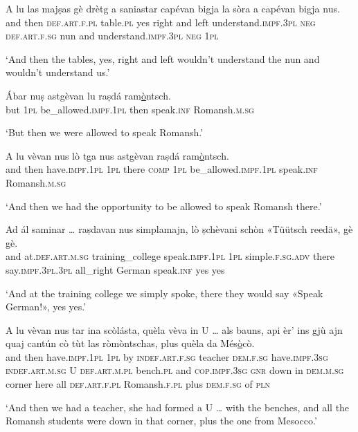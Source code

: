 \begin{linenumbers}
\gll    A lu las majṣas gè drètg a saniastar capévan bigja la sòra a capévan bigja nus.\\
and then \textsc{def.art.f.pl} table.\textsc{pl} yes right and left understand.\textsc{impf.3pl} \textsc{neg} \textsc{def.art.f.sg} nun and understand.\textsc{impf.3pl} \textsc{neg} \textsc{1pl}\\
\end{linenumbers}
\medskip
\glt `And then the tables, yes, right and left wouldn’t understand the nun and wouldn’t understand us.'
\medskip

\begin{linenumbers}
\gll    Ábar nuṣ astgèvan lu raṣdá ram\underline{ò}ntsch.\\
but \textsc{1pl}  be\_allowed.\textsc{impf.1pl} then speak.\textsc{inf} Romansh.\textsc{m.sg}\\
\end{linenumbers}
\medskip
\glt `But then we were allowed to speak Romansh.'
\medskip

\begin{linenumbers}
\gll    A lu vèvan nus lò tga nus astgèvan raṣdá ram\underline{ò}ntsch.\\
and then have.\textsc{impf.1pl} \textsc{1pl} there \textsc{comp} \textsc{1pl} be\_allowed.\textsc{impf.1pl} speak.\textsc{inf} Romansh.\textsc{m.sg} \\
\end{linenumbers}
\medskip
\glt `And then we had the opportunity to be allowed to speak Romansh there.'
\medskip

\begin{linenumbers}
\gll    Ad ál saminar … raṣdavan nus simplamajn, lò ṣchèvani schòn «Tüütsch reedä»\footnotemark, gè gè.\\
and at.\textsc{def.art.m.sg} training\_college {} speak.\textsc{impf.1pl} \textsc{1pl} simple.\textsc{f.sg.adv} there  say.\textsc{impf.3pl.3pl} all\_right German speak.\textsc{inf} yes yes \\
\end{linenumbers}
\medskip
\glt `And at the training college we simply spoke, there they would say «Speak German!», yes  yes.'
\medskip

\begin{linenumbers}
\gll    A lu vèvan nus tar ina scòlásta, quèla vèva in U … als bauns, api èr’ ins gjù ajn quaj cantún cò tùt las ròmòntschas, plus quèla da Més\underline{ò}cò.\footnotemark\\
and then have.\textsc{impf.1pl} \textsc{1pl} by \textsc{indef.art.f.sg} teacher \textsc{dem.f.sg}  have.\textsc{impf.3sg} \textsc{indef.art.m.sg} U {} \textsc{def.art.m.pl} bench.\textsc{pl} and \textsc{cop.impf.3sg} \textsc{gnr} down in \textsc{dem.m.sg} corner here all \textsc{def.art.f.pl} Romansh.\textsc{f.pl} plus \textsc{dem.f.sg} of \textsc{pln}\\
\end{linenumbers}
\medskip
\glt `And then we had a teacher, she had formed a U … with the benches, and all the Romansh students were down in that corner, plus the one from Mesocco.'
\medskip

